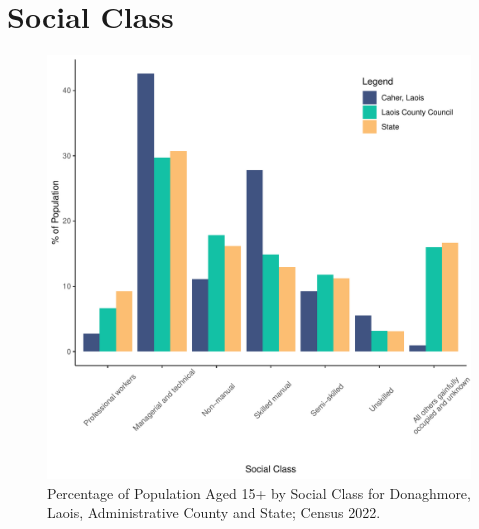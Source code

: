 \documentclass{article}
\begin{document}
\section{Social Class}\label{sect:SC}
\begin{figure}[H]
	\centering
	\includegraphics[width = 140mm]{../figures/SocialClassED.pdf}
	\caption{Percentage of Population Aged 15+ by Social Class for Donaghmore, Laois, Administrative County and State; Census 2022.}
	\label{fig:vbnv}
	\end{figure}
\end{document}
